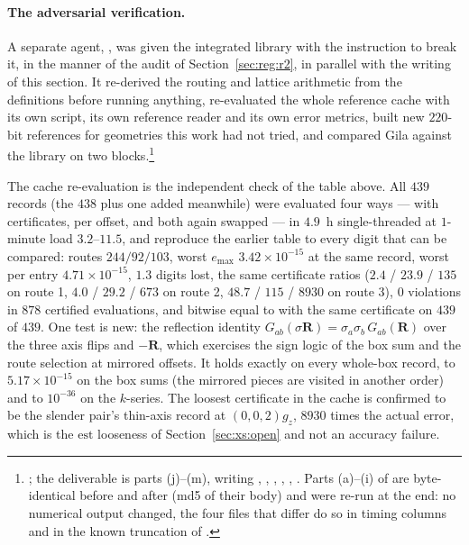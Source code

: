 \paragraph{The adversarial verification.}
\label{sec:xs:adv}
A separate agent, , was given the integrated library with the instruction to
break it, in the manner of the audit of Section~\ref{sec:reg:r2}, in parallel with the
writing of this section. It re-derived the routing and lattice arithmetic from the
definitions before running anything, re-evaluated the whole reference cache with its own
script, its own reference reader and its own error metrics, built new $220$-bit references
for geometries this work had not tried, and compared Gila against the library on two
blocks.\footnote{; the deliverable is
 parts (j)--(m), writing ,
, , , ,
. Parts (a)--(i) of  are byte-identical before and
after (md5  of their body) and were re-run at the end: no numerical output
changed, the four files that differ do so in timing columns and in the known truncation of
.}

The cache re-evaluation is the independent check of the table above. All $439$ records
(the $438$ plus one added meanwhile) were evaluated four ways ---  with
certificates,  per offset, and both again swapped --- in $4.9$~h
single-threaded at $1$-minute load $3.2$--$11.5$, and reproduce the earlier table to every
digit that can be compared: routes $244/92/103$, worst $e_{\max}$ $3.42\times10^{-15}$ at
the same record, worst per entry $4.71\times10^{-15}$, $1.3$ digits lost, the same
certificate ratios ($2.4$ / $23.9$ / $135$ on route 1, $4.0$ / $29.2$ / $673$ on route 2,
$48.7$ / $115$ / $8930$ on route 3), $0$ violations in $878$ certified evaluations, and
 bitwise equal to  with the same certificate on $439$ of
$439$. One test is new: the reflection identity
$G_{ab}(\sigma\mathbf{R}) = \sigma_a\sigma_b\,G_{ab}(\mathbf{R})$ over the three axis flips
and $-\mathbf{R}$, which exercises the sign logic of the box sum and the route selection at
mirrored offsets. It holds exactly on every whole-box record, to $5.17\times10^{-15}$ on the
box sums (the mirrored pieces are visited in another order) and to $10^{-36}$ on the
$k$-series. The loosest certificate in the cache is confirmed to be the slender pair's
thin-axis record at $(0,0,2)g_z$, $8930$ times the actual error, which is the $\mathrm{est}$
looseness of Section~\ref{sec:xs:open} and not an accuracy failure.

